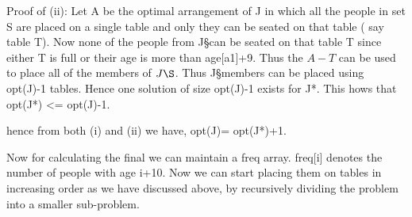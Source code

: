 \documentclass{article}
\begin{document}
Proof of (ii):
Let A be the optimal arrangement of J in which all the people in set S are placed on a single table and only they can be seated on that table ( say table T). Now none of the people from J\S can be seated on that table T since either T is full or their age is more than age[a1]+9. Thus the $A-T$ can be used to place all of the members of $J\S$. Thus J\S members can be placed using opt(J)-1 tables. Hence one solution of size opt(J)-1 exists for J*. This hows that opt(J*) <= opt(J)-1.

hence from both (i) and (ii) we have, opt(J)= opt(J*)+1.

Now for calculating the final we can maintain a freq array. freq[i]  denotes the number of people with age i+10. Now we can start placing them on tables in increasing order as we have discussed above, by recursively dividing the problem into a smaller sub-problem. 
\end{document}
